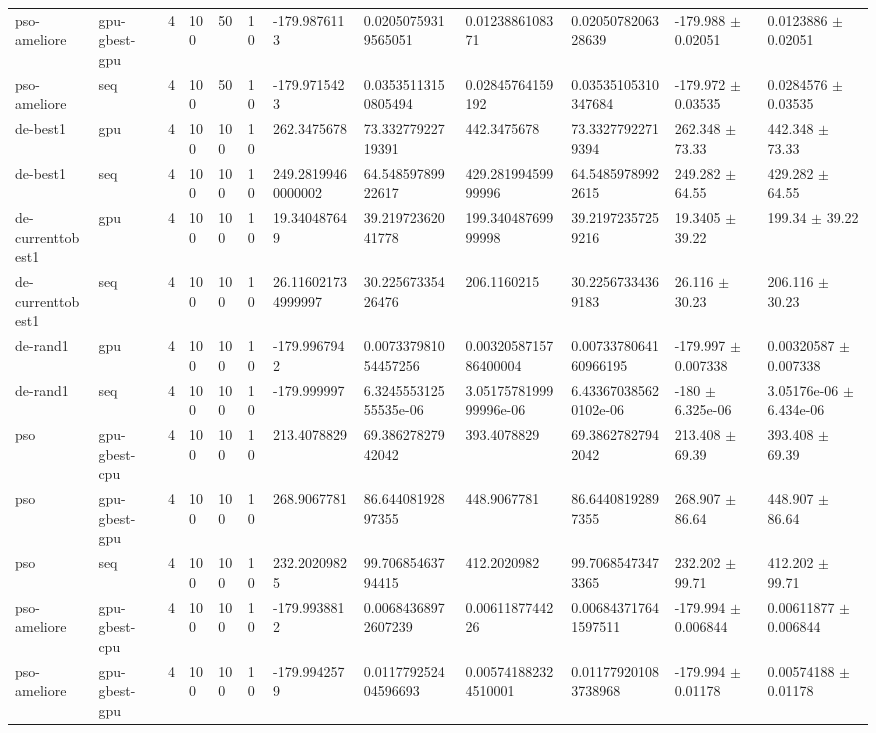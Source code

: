 \begin{table}[t]
\begin{tabular}{llllllllllll}
pso-ameliore & gpu-gbest-gpu & 4 & 100 & 50 & 10 & -179.9876113 & 0.02050759319565051 & 0.0123886108371 & 0.0205078206328639 & -179.988 $\pm$ 0.02051 & 0.0123886 $\pm$ 0.02051 \\
pso-ameliore & seq & 4 & 100 & 50 & 10 & -179.9715423 & 0.03535113150805494 & 0.02845764159192 & 0.03535105310347684 & -179.972 $\pm$ 0.03535 & 0.0284576 $\pm$ 0.03535 \\
de-best1 & gpu & 4 & 100 & 100 & 10 & 262.3475678 & 73.33277922719391 & 442.3475678 & 73.33277922719394 & 262.348 $\pm$ 73.33 & 442.348 $\pm$ 73.33 \\
de-best1 & seq & 4 & 100 & 100 & 10 & 249.28199460000002 & 64.54859789922617 & 429.28199459999996 & 64.54859789922615 & 249.282 $\pm$ 64.55 & 429.282 $\pm$ 64.55 \\
de-currenttobest1 & gpu & 4 & 100 & 100 & 10 & 19.340487649 & 39.21972362041778 & 199.34048769999998 & 39.21972357259216 & 19.3405 $\pm$ 39.22 & 199.34 $\pm$ 39.22 \\
de-currenttobest1 & seq & 4 & 100 & 100 & 10 & 26.116021734999997 & 30.22567335426476 & 206.1160215 & 30.22567334369183 & 26.116 $\pm$ 30.23 & 206.116 $\pm$ 30.23 \\
de-rand1 & gpu & 4 & 100 & 100 & 10 & -179.9967942 & 0.007337981054457256 & 0.0032058715786400004 & 0.0073378064160966195 & -179.997 $\pm$ 0.007338 & 0.00320587 $\pm$ 0.007338 \\
de-rand1 & seq & 4 & 100 & 100 & 10 & -179.999997 & 6.324555312555535e-06 & 3.0517578199999996e-06 & 6.433670385620102e-06 & -180 $\pm$ 6.325e-06 & 3.05176e-06 $\pm$ 6.434e-06 \\
pso & gpu-gbest-cpu & 4 & 100 & 100 & 10 & 213.4078829 & 69.38627827942042 & 393.4078829 & 69.38627827942042 & 213.408 $\pm$ 69.39 & 393.408 $\pm$ 69.39 \\
pso & gpu-gbest-gpu & 4 & 100 & 100 & 10 & 268.9067781 & 86.64408192897355 & 448.9067781 & 86.64408192897355 & 268.907 $\pm$ 86.64 & 448.907 $\pm$ 86.64 \\
pso & seq & 4 & 100 & 100 & 10 & 232.20209825 & 99.70685463794415 & 412.2020982 & 99.70685473473365 & 232.202 $\pm$ 99.71 & 412.202 $\pm$ 99.71 \\
pso-ameliore & gpu-gbest-cpu & 4 & 100 & 100 & 10 & -179.9938812 & 0.00684368972607239 & 0.0061187744226 & 0.006843717641597511 & -179.994 $\pm$ 0.006844 & 0.00611877 $\pm$ 0.006844 \\
pso-ameliore & gpu-gbest-gpu & 4 & 100 & 100 & 10 & -179.9942579 & 0.011779252404596693 & 0.005741882324510001 & 0.011779201083738968 & -179.994 $\pm$ 0.01178 & 0.00574188 $\pm$ 0.01178 \\

\end{tabular}
\end{table}
